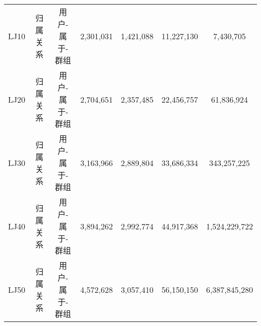 \begin{table} [t]
\begin{center}
{\begin{tabular}{|c|c|c|c|c|c|c|}
      \hline
      LJ10 & 归属关系 & 用户-属于-群组& 2,301,031& 1,421,088& 11,227,130& 7,430,705\\
			LJ20 & 归属关系 & 用户-属于-群组& 2,704,651& 2,357,485& 22,456,757& 61,836,924\\
			LJ30 & 归属关系 & 用户-属于-群组& 3,163,966& 2,889,804& 33,686,334& 343,257,225\\
			LJ40 & 归属关系 & 用户-属于-群组& 3,894,262& 2,992,774& 44,917,368& 1,524,229,722\\
			LJ50 & 归属关系 & 用户-属于-群组& 4,572,628& 3,057,410& 56,150,150& 6,387,845,280\\
      

			\hline
		\end{tabular}
				}
	\end{center}
	\vspace{-0.1in}
\end{table}

